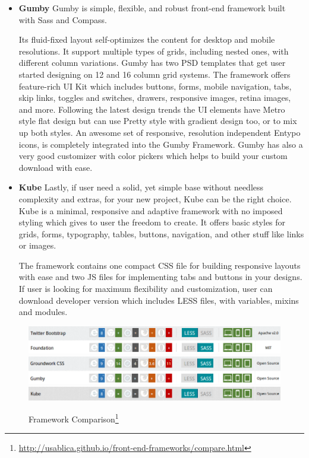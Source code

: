 \begin{itemize}
\item \textbf{Gumby}            
\newline
Gumby is simple, flexible, and robust front-end framework built with Sass and Compass.

Its fluid-fixed layout self-optimizes the content for desktop and mobile resolutions. It support multiple types of grids, including nested ones, with different column variations. Gumby has two PSD templates that get user started designing on 12 and 16 column grid systems.
The framework offers feature-rich UI Kit which includes buttons, forms, mobile navigation, tabs, skip links, toggles and switches, drawers, responsive images, retina images, and more. Following the latest design trends the UI elements have Metro style flat design but can use Pretty style with gradient design too, or to mix up both styles. An awesome set of responsive, resolution independent Entypo icons, is completely integrated into the Gumby Framework. Gumby has also a very good customizer with color pickers which helps to build your custom download with ease.
\item \textbf{Kube}
\newline
Lastly, if user need a solid, yet simple base without needless complexity and extras, for your new project, Kube can be the right choice. Kube is a minimal, responsive and adaptive framework with no imposed styling which gives to user the freedom to create. It offers basic styles for grids, forms, typography, tables, buttons, navigation, and other stuff like links or images.

The framework contains one compact CSS file for building responsive layouts with ease and two JS files for implementing tabs and buttons in your designs. If user is looking for maximum flexibility and customization, user can download developer version which includes LESS files, with variables, mixins and modules.
\end{itemize}

\begin{figure}[!ht]
\centering
\includegraphics[scale=0.7]{images/Bootstrap&Foundation.png}
\includegraphics[scale=0.7]{images/Groundwork&Gumby.png} 
\includegraphics[scale=0.7]{images/Kube.png}  
\caption[Framework Comparison]{Framework Comparison\footnote{\url{http://usablica.github.io/front-end-frameworks/compare.html}}}
\label{img:Bootstrap&Foundation.png}
\label{img:Groundwork&Gumby.png}   
\label{img:Kube.png}                          
\end{figure}

